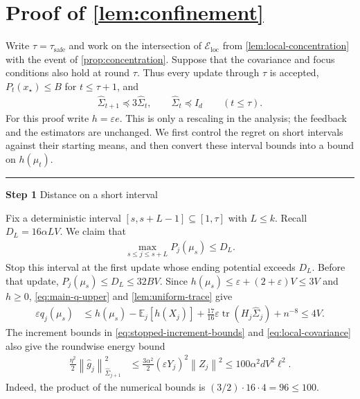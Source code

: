 \documentclass[11pt]{article}
\newcommand{\proofstep}[2]{%
    \par\medskip
    \noindent
    \textcolor{blue!55!black}{\rule{2pt}{1.2em}}%
    \hspace{0.6em}%
    {\sffamily\bfseries\color{blue!55!black}Step #1}%
    \quad
    {\sffamily #2}%
    \par\smallskip
}
\newcommand{\E}{\mathbb E}
\newcommand{\tr}{\operatorname{tr}}
\newcommand{\1}{\mathbf 1}
\newcommand{\eps}{\varepsilon}
\newcommand{\norm}[1]{\left\lVert #1\right\rVert}
\newcommand{\normm}[2]{\left\lVert #1\right\rVert_{#2}}
\begin{document}
\section{Proof of \cref{lem:confinement}}
\label{app:confinement}

Write $\tau=\tau_{\mathrm{safe}}$ and work on the intersection of
$\mathcal E_{\mathrm{loc}}$ from \cref{lem:local-concentration} with the
event of \cref{prop:concentration}. Suppose that the covariance and focus
conditions also hold at round $\tau$. Thus every update through $\tau$ is
accepted, $P_t(x_\star)\leq B$ for $t\leq\tau+1$, and
\begin{align}
    \widehat\Sigma_{t+1}\preceq3\widehat\Sigma_t,
    \qquad\widehat\Sigma_t\preceq I_d
    \qquad(t\leq\tau).
    \label{eq:local-covariance}
\end{align}
For this proof write $h=\eps e$. This is only a rescaling in the analysis;
the feedback and the estimators are unchanged. We first control the
regret on short intervals against their starting means, and then convert
these interval bounds into a bound on $h(\mu_t)$.

\proofstep{1}{Distance on a short interval}
Fix a deterministic interval $[s,s+L-1]\subseteq[1,\tau]$ with $L\leq k$.
Recall $D_L=16\alpha LV$. We claim that
\begin{align}
    \max_{s\leq j\leq s+L}P_j(\mu_s)\leq D_L.
    \label{eq:local-distance}
\end{align}
Stop this interval at the first update whose ending potential exceeds
$D_L$. Before that update, $P_j(\mu_s)\leq D_L\leq32BV$.
Since $h(\mu_s)\leq\eps+(2+\eps)V\leq3V$ and $h\geq0$,
\eqref{eq:main-q-upper} and \cref{lem:uniform-trace} give
\begin{align}
    \eps q_j(\mu_s)
     & \leq h(\mu_s)-\E_j[h(X_j)]
    +\frac{17}{16}\eps\tr(H_j\widehat\Sigma_j)+n^{-8}
    \leq4V.
    \label{eq:local-q-upper}
\end{align}
The increment bounds in \eqref{eq:stopped-increment-bounds} and
\eqref{eq:local-covariance} also give the roundwise energy bound
\begin{align}
    \frac{\eta^2}{2}\normm{\widehat g_j}{\widehat\Sigma_{j+1}}^2
     & \leq\frac{3\alpha^2}{2}(\eps Y_j)^2\norm{Z_j}^2
    \leq100\alpha^2dV^2\ell^2.
    \label{eq:local-energy}
\end{align}
Indeed, the product of the numerical bounds is
$(3/2)\cdot16\cdot4=96\leq100$.
\end{document}
